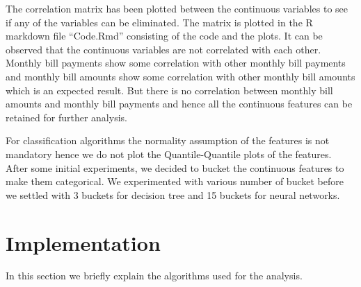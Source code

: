 \documentclass{article}
\begin{document}
\noindent The correlation matrix has been plotted between the continuous variables to see if any of the variables can be eliminated. The matrix is plotted in the R markdown file “Code.Rmd”  consisting of the code and the plots. It can be observed that the  continuous variables are not correlated with each other.  Monthly bill payments show some correlation with other monthly bill payments and monthly bill amounts show some correlation with other monthly bill amounts which is an expected result. But there is no correlation between monthly bill amounts and monthly bill payments and hence all the continuous features can be retained for further analysis.

\noindent For classification algorithms the normality assumption of the features is not mandatory hence we do not plot the Quantile-Quantile plots of the features. After some initial experiments, we decided to bucket the continuous features to make them categorical. We experimented with various number of bucket before we settled with 3 buckets for decision tree and 15 buckets for neural networks.


\section{Implementation}
 
In this section we briefly explain the algorithms used for the analysis. 
\end{document}
